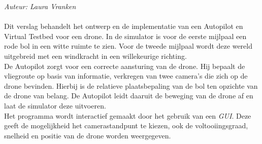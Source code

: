 \noindent
{\em Auteur: Laura Vranken }\\
\\
Dit verslag behandelt het ontwerp en de implementatie van een Autopilot en Virtual Testbed voor een drone. In de simulator is voor de eerste mijlpaal een rode bol in een witte ruimte te zien. Voor de tweede mijlpaal wordt deze wereld uitgebreid met een windkracht in een willekeurige richting.
\\
De Autopilot zorgt voor een correcte aansturing van de drone. Hij bepaalt de vliegroute op basis van informatie, verkregen van twee camera's die zich op de drone bevinden. Hierbij is de relatieve plaatsbepaling van de bol ten opzichte van de drone van belang. De Autopilot leidt daaruit de beweging van de drone af en laat de simulator deze uitvoeren.
\\
Het programma wordt interactief gemaakt door het gebruik van een \textit{GUI}. Deze geeft de mogelijkheid het camerastandpunt te kiezen, ook de voltooiingsgraad, snelheid en positie van de drone worden weergegeven.